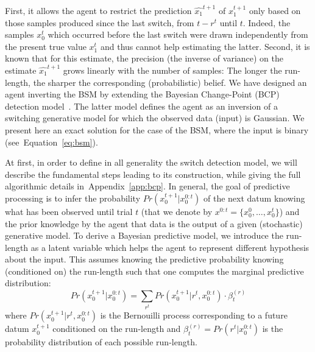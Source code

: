 \documentclass[12pt,english]{article}%
\newcommand{\eql}[1]{\begin{equation}#1\end{equation}}
\newcommand{\citep}[1]{\parencite{#1}}
\newcommand{\seeEq}[1]{Equation~\ref{eq:#1}}
\newcommand{\seeApp}[1]{Appendix~\ref{app:#1}}
\begin{document}
First, it allows the agent to restrict the prediction $\hat{x_1}^{t+1}$ of $x_1^{t+1}$
only based on those samples produced since the last switch, from $t-r^t$ until $t$.
Indeed, the samples $x_0^t$ which occurred before the last switch
were drawn independently from the present true value $x_1^t$
and thus cannot help estimating the latter.
Second, it is known that for this estimate, the precision
(the inverse of variance) on the estimate $\hat{x_1}^{t+1}$
grows linearly with the number of samples:
The longer the run-length, the sharper the corresponding (probabilistic) belief.
We have designed an agent inverting the BSM by extending
the Bayesian Change-Point (BCP) detection model~\citep{AdamsMackay2007}.
The latter model defines the agent as an inversion of a switching generative model
for which the observed data (input) is Gaussian.
We present here an exact solution for the case of the BSM, where the input is binary (see~\seeEq{bsm}).

At first, in order to define in all generality the switch detection model,
we will describe the fundamental steps leading to its construction,
while giving the full algorithmic details in~\seeApp{bcp}.
In general, the goal of predictive processing
is to infer the probability $Pr(x_0^{t+1} | x_0^{0:t})$ of the next datum
knowing what has been observed until trial $t$
(that we denote by $x^{0:t} = \{ x_0^0, \ldots, x_0^t \}$) and
the prior knowledge by the agent
that data is the output of a given (stochastic) generative model.
To derive a Bayesian predictive model, we introduce
the run-length as a latent variable which helps the agent to represent
different hypothesis about the input.
%
%
This assumes knowing the predictive probability knowing (conditioned on) the run-length
such that one computes the marginal predictive distribution:
\eql{
Pr(x_0^{t+1} | x_0^{0:t}) =
\sum_{r^{t}} Pr(x_0^{t+1} | r^{t}, x_0^{0:t}) \cdot \beta^{(r)}_t
\label{eq:pred}
}
where $Pr(x_0^{t+1} | r^{t}, x_0^{0:t})$ is
the Bernouilli process corresponding to a future datum $x_0^{t+1}$
conditioned on the run-length and
$\beta^{(r)}_t=Pr(r^t | x_0^{0:t})$ is the probability distribution of each possible run-length.
\end{document}
